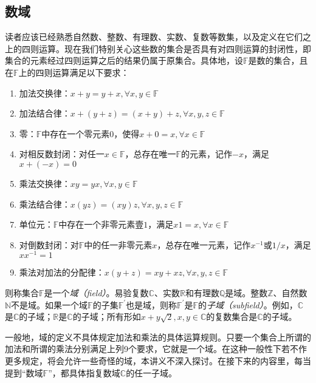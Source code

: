 \documentclass[../main.tex]{subfiles}
\begin{document}

\subsection{数域}
读者应该已经熟悉自然数、整数、有理数、实数、复数等数集，以及定义在它们之上的四则运算。现在我们特别关心这些数的集合是否具有对四则运算的封闭性，即集合的元素经过四则运算之后的结果仍属于原集合。具体地，设$\mathbb{F}$是数的集合，且在$\mathbb{F}$上的四则运算满足以下要求：
\begin{enumerate}
    \item 加法交换律：$x+y=y+x,\forall x,y\in\mathbb{F}$
    \item 加法结合律：$x+\left(y+z\right)=\left(x+y\right)+z,\forall x,y,z\in\mathbb{F}$
    \item 零：$\mathbb{F}$中存在一个零元素$0$，使得$x+0=x,\forall x\in\mathbb{F}$
    \item 对相反数封闭：对任一$x\in\mathbb{F}$，总存在唯一$\mathbb{F}$的元素，记作$-x$，满足$x+\left(-x\right)=0$
    \item 乘法交换律：$xy=yx,\forall x,y\in\mathbb{F}$
    \item 乘法结合律：$x\left(yz\right)=\left(xy\right)z,\forall x,y,z\in\mathbb{F}$
    \item 单位元：$\mathbb{F}$中存在一个非零元素壹$1$，满足$x1=x,\forall x\in\mathbb{F}$
    \item 对倒数封闭：对$\mathbb{F}$中的任一非零元素$x$，总存在唯一元素，记作$x^{-1}$或$1/x$，满足$xx^{-1}=1$
    \item 乘法对加法的分配律：$x\left(y+z\right)=xy+xz,\forall x,y,z\in\mathbb{F}$
\end{enumerate}
则称集合$\mathbb{F}$是一个\emph{域（field）}。易验复数$\mathbb{C}$、实数$\mathbb{R}$和有理数$\mathbb{Q}$是域。整数$\mathbb{Z}$、自然数$\mathbb{N}$不是域。如果一个域$\mathbb{F}$的子集$\mathbb{F}^\prime$也是域，则称$\mathbb{F}^\prime$是$\mathbb{F}$的\emph{子域（subfield）}。例如，$\mathbb{C}$是$\mathbb{C}$的子域；$\mathbb{R}$是$\mathbb{C}$的子域；所有形如$x+y\sqrt{2},x,y\in\mathbb{C}$的复数集合是$\mathbb{C}$的子域。

一般地，域的定义不具体规定加法和乘法的具体运算规则。只要一个集合上所谓的加法和所谓的乘法分别满足上列9个要求，它就是一个域。在这种一般性下若不作更多规定，将会允许一些奇怪的域，本讲义不深入探讨。在接下来的内容里，每当提到“数域$\mathbb{F}$”，都具体指复数域$\mathbb{C}$的任一子域。
\end{document}
